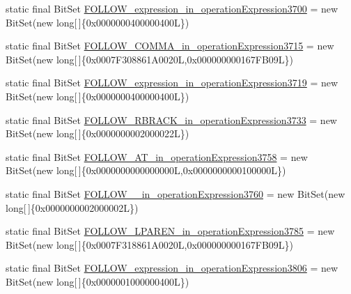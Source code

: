 \begin{DoxyCompactItemize}
\item 
static final Bit\-Set \hyperlink{classorg_1_1tzi_1_1use_1_1parser_1_1soil_1_1_soil_parser_a4a9d33c58ce736d7a19898df12b5569d}{F\-O\-L\-L\-O\-W\-\_\-expression\-\_\-in\-\_\-operation\-Expression3700} = new Bit\-Set(new long\mbox{[}$\,$\mbox{]}\{0x0000000400000400\-L\})
\item 
static final Bit\-Set \hyperlink{classorg_1_1tzi_1_1use_1_1parser_1_1soil_1_1_soil_parser_adeb1cf1e401fcffa3f1d6e40217b58bd}{F\-O\-L\-L\-O\-W\-\_\-\-C\-O\-M\-M\-A\-\_\-in\-\_\-operation\-Expression3715} = new Bit\-Set(new long\mbox{[}$\,$\mbox{]}\{0x0007\-F308861\-A0020\-L,0x000000000167\-F\-B09\-L\})
\item 
static final Bit\-Set \hyperlink{classorg_1_1tzi_1_1use_1_1parser_1_1soil_1_1_soil_parser_a2038423592f35865b87575d9de174ad3}{F\-O\-L\-L\-O\-W\-\_\-expression\-\_\-in\-\_\-operation\-Expression3719} = new Bit\-Set(new long\mbox{[}$\,$\mbox{]}\{0x0000000400000400\-L\})
\item 
static final Bit\-Set \hyperlink{classorg_1_1tzi_1_1use_1_1parser_1_1soil_1_1_soil_parser_af8a35b269ebb6911fea589e0344acbb0}{F\-O\-L\-L\-O\-W\-\_\-\-R\-B\-R\-A\-C\-K\-\_\-in\-\_\-operation\-Expression3733} = new Bit\-Set(new long\mbox{[}$\,$\mbox{]}\{0x0000000002000022\-L\})
\item 
static final Bit\-Set \hyperlink{classorg_1_1tzi_1_1use_1_1parser_1_1soil_1_1_soil_parser_a4dfc2f2b014946f2a76162e5fc12f20b}{F\-O\-L\-L\-O\-W\-\_\-\-A\-T\-\_\-in\-\_\-operation\-Expression3758} = new Bit\-Set(new long\mbox{[}$\,$\mbox{]}\{0x0000000000000000\-L,0x0000000000100000\-L\})
\item 
static final Bit\-Set \hyperlink{classorg_1_1tzi_1_1use_1_1parser_1_1soil_1_1_soil_parser_a5ca0483e25387222bc746e74b8882277}{F\-O\-L\-L\-O\-W\-\_\-\_\-in\-\_\-operation\-Expression3760} = new Bit\-Set(new long\mbox{[}$\,$\mbox{]}\{0x0000000002000002\-L\})
\item 
static final Bit\-Set \hyperlink{classorg_1_1tzi_1_1use_1_1parser_1_1soil_1_1_soil_parser_aca24497a5d78d9565b884303b6e0d4b5}{F\-O\-L\-L\-O\-W\-\_\-\-L\-P\-A\-R\-E\-N\-\_\-in\-\_\-operation\-Expression3785} = new Bit\-Set(new long\mbox{[}$\,$\mbox{]}\{0x0007\-F318861\-A0020\-L,0x000000000167\-F\-B09\-L\})
\item 
static final Bit\-Set \hyperlink{classorg_1_1tzi_1_1use_1_1parser_1_1soil_1_1_soil_parser_a0d2308f567a5a8cb62bb438bb5e0900b}{F\-O\-L\-L\-O\-W\-\_\-expression\-\_\-in\-\_\-operation\-Expression3806} = new Bit\-Set(new long\mbox{[}$\,$\mbox{]}\{0x0000001000000400\-L\})

\end{DoxyCompactItemize}
